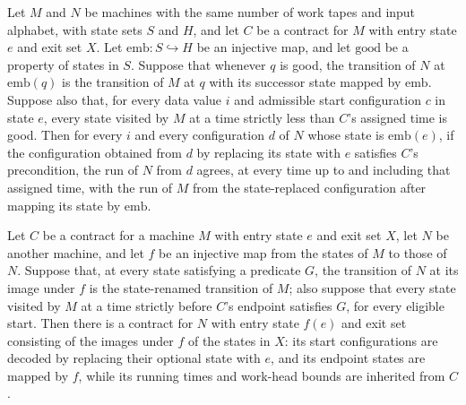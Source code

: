 \begin{lemma}
\label{Turing.Contract.mapState_traj}
\leanok
{}
Let $M$ and $N$ be machines with the same number of work tapes and input alphabet, with
state sets $S$ and $H$, and let $C$ be a contract for $M$ with entry state $e$ and exit
set $X$. Let $\mathrm{emb}:S\hookrightarrow H$ be an injective map, and let
$\mathrm{good}$ be a property of states in $S$. Suppose that whenever $q$ is good, the
transition of $N$ at $\mathrm{emb}(q)$ is the transition of $M$ at $q$ with its
successor state mapped by $\mathrm{emb}$. Suppose also that, for every data value $i$
and admissible start configuration $c$ in state $e$, every state visited by $M$ at a
time strictly less than $C$’s assigned time is good. Then for every $i$ and every
configuration $d$ of $N$ whose state is $\mathrm{emb}(e)$, if the configuration
obtained from $d$ by replacing its state with $e$ satisfies $C$’s precondition, the run
of $N$ from $d$ agrees, at every time up to and including that assigned time, with the
run of $M$ from the state-replaced configuration after mapping its state by
$\mathrm{emb}$.
\end{lemma}

\begin{definition}
\label{Turing.Contract.mapState}
\leanok
{}
Let $C$ be a contract for a machine $M$ with entry state $e$ and exit set $X$, let $N$
be another machine, and let $f$ be an injective map from the states of $M$ to those of
$N$. Suppose that, at every state satisfying a predicate $G$, the transition of $N$ at
its image under $f$ is the state-renamed transition of $M$; also suppose that every
state visited by $M$ at a time strictly before $C$’s endpoint satisfies $G$, for every
eligible start. Then there is a contract for $N$ with entry state $f(e)$ and exit set
consisting of the images under $f$ of the states in $X$: its start configurations are
decoded by replacing their optional state with $e$, and its endpoint states are mapped
by $f$, while its running times and work-head bounds are inherited from $C$.
\end{definition}

